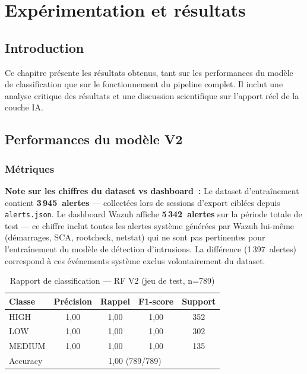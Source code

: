 \documentclass[12pt,a4paper]{report}
\begin{document}
\chapter{Expérimentation et résultats}
\label{chap:resultats}

\section*{Introduction}
Ce chapitre présente les résultats obtenus, tant sur les
performances du modèle de classification que sur le fonctionnement
du pipeline complet. Il inclut une analyse critique des résultats
et une discussion scientifique sur l'apport réel de la couche IA.

\section{Performances du modèle V2}

\subsection{Métriques}

\begin{tcolorbox}[colback=gray!5, colframe=gray!40, arc=4pt, boxrule=0.5pt]
\textbf{Note sur les chiffres du dataset vs dashboard~:}
Le dataset d'entraînement contient \textbf{3\,945~alertes} — collectées lors de sessions d'export ciblées depuis \texttt{alerts.json}. Le dashboard Wazuh affiche \textbf{5\,342~alertes} sur la période totale de test — ce chiffre inclut toutes les alertes système générées par Wazuh lui-même (démarrages, SCA, rootcheck, netstat) qui ne sont pas pertinentes pour l'entraînement du modèle de détection d'intrusions. La différence (1\,397~alertes) correspond à ces événements système exclus volontairement du dataset.
\end{tcolorbox}

\begin{table}[H]
\centering
\caption{Rapport de classification — RF V2 (jeu de test, n=789)}
\label{tab:metrics}
\begin{tabular}{|l|c|c|c|c|}
\hline
\rowcolor{ColSection!15}
\textbf{Classe} & \textbf{Précision} & \textbf{Rappel}
  & \textbf{F1-score} & \textbf{Support} \\
\hline
HIGH   & 1,00 & 1,00 & 1,00 & 352 \\
LOW    & 1,00 & 1,00 & 1,00 & 302 \\
MEDIUM & 1,00 & 1,00 & 1,00 & 135 \\
\hline
Accuracy & \multicolumn{4}{c|}{1,00 (789/789)} \\
\hline
\end{tabular}
\end{table}
\end{document}

